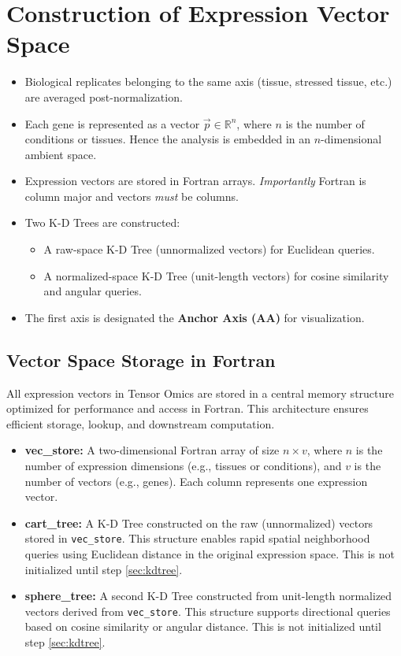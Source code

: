 \documentclass{article}
\begin{document}
\section{Construction of Expression Vector Space}
\label{sec:vecspace}
\begin{itemize}
  \item Biological replicates belonging to the same axis (tissue, stressed
    tissue, etc.) are averaged post-normalization.
    \item Each gene is represented as a vector \( \vec{p} \in \mathbb{R}^n \),
      where \( n \) is the number of conditions or tissues. Hence the analysis
      is embedded in an $n$-dimensional ambient space.
    \item Expression vectors are stored in Fortran arrays. \emph{Importantly}
      Fortran is column major and vectors \emph{must} be columns.
    \item Two K-D Trees are constructed:
    \begin{itemize}
        \item A raw-space K-D Tree (unnormalized vectors) for Euclidean queries.
        \item A normalized-space K-D Tree (unit-length vectors) for cosine similarity and angular queries.
    \end{itemize}
  \item The first axis is designated the \textbf{Anchor Axis (AA)} for
    visualization.
\end{itemize}

\subsection{Vector Space Storage in Fortran}
\label{sec:vecstore}

All expression vectors in Tensor Omics are stored in a central memory structure optimized for performance and access in Fortran. This architecture ensures efficient storage, lookup, and downstream computation.

\begin{itemize}
    \item \textbf{vec\_store:} A two-dimensional Fortran array of size \( n \times v \), where \( n \) is the number of expression dimensions (e.g., tissues or conditions), and \( v \) is the number of vectors (e.g., genes). Each column represents one expression vector.
    
    \item \textbf{cart\_tree:} A K-D Tree constructed on the raw (unnormalized) vectors stored in \texttt{vec\_store}. This structure enables rapid spatial neighborhood queries using Euclidean distance in the original expression space. This is not initialized until step \ref{sec:kdtree}.
    
    \item \textbf{sphere\_tree:} A second K-D Tree constructed from unit-length normalized vectors derived from \texttt{vec\_store}. This structure supports directional queries based on cosine similarity or angular distance. This is not initialized until step \ref{sec:kdtree}.
    
    
\end{itemize}
\end{document}
